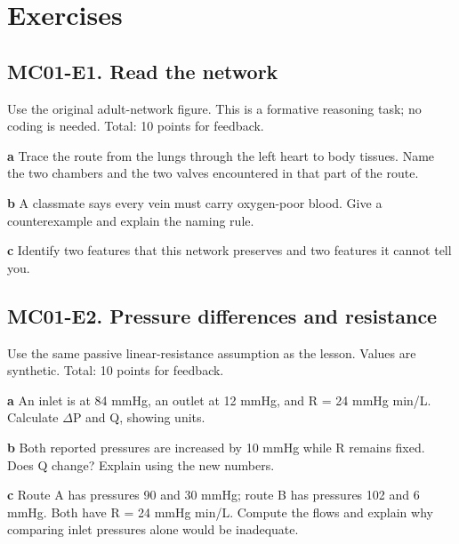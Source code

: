 \documentclass[11pt,letterpaper]{article}
\theoremstyle{definition}\newtheorem{definition}{Definition}\newtheorem{example}{Example}
\numberwithin{equation}{section}
\begin{document}
\section*{Exercises}
\par\noindent\begin{minipage}{\linewidth}
\subsection*{MC01-E1. Read the network}
Use the original adult-network figure. This is a formative reasoning task; no coding is needed. Total: 10 points for feedback.

\textbf{a} Trace the route from the lungs through the left heart to body tissues. Name the two chambers and the two valves encountered in that part of the route.

\end{minipage}\par\medskip
\textbf{b} A classmate says every vein must carry oxygen-poor blood. Give a counterexample and explain the naming rule.

\textbf{c} Identify two features that this network preserves and two features it cannot tell you.

\par\noindent\begin{minipage}{\linewidth}
\subsection*{MC01-E2. Pressure differences and resistance}
Use the same passive linear-resistance assumption as the lesson. Values are synthetic. Total: 10 points for feedback.

\textbf{a} An inlet is at 84 mmHg, an outlet at 12 mmHg, and R =\allowbreak{} 24 mmHg min/L. Calculate $\Delta$P and Q, showing units.

\end{minipage}\par\medskip
\textbf{b} Both reported pressures are increased by 10 mmHg while R remains fixed. Does Q change? Explain using the new numbers.

\textbf{c} Route A has pressures 90 and 30 mmHg; route B has pressures 102 and 6 mmHg. Both have R =\allowbreak{} 24 mmHg min/L. Compute the flows and explain why comparing inlet pressures alone would be inadequate.
\end{document}

